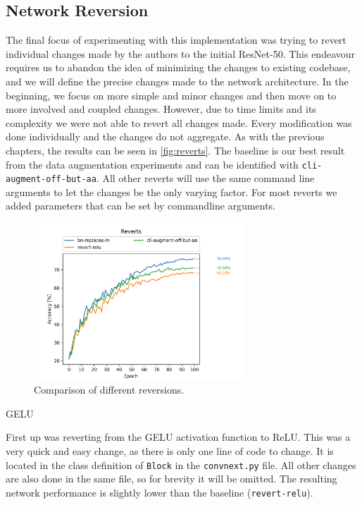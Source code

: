 \documentclass{article}
\begin{document}
\subsection{Network Reversion}\label{subsec:network-reversion}
The final focus of experimenting with this implementation was trying to revert individual changes made by the authors to the initial ResNet-50.
This endeavour requires us to abandon the idea of minimizing the changes to existing codebase, and we will define the precise changes made to the network architecture.
In the beginning, we focus on more simple and minor changes and then move on to more involved and coupled changes.
However, due to time limits and its complexity we were not able to revert all changes made.
Every modification was done individually and the changes do not aggregate.
As with the previous chapters, the results can be seen in \autoref{fig:reverts}.
The baseline is our best result from the data augmentation experiments and can be identified with \texttt{cli-augment-off-but-aa}.
All other reverts will use the same command line arguments to let the changes be the only varying factor.
For most reverts we added parameters that can be set by commandline arguments.

\begin{figure}[h]
    \centering
    \includegraphics[width=0.7\textwidth]{images/reverts}
    \caption{Comparison of different reversions.}
    \label{fig:reverts}
\end{figure}

GELU

First up was reverting from the GELU activation function to ReLU\@.
This was a very quick and easy change, as there is only one line of code to change.
It is located in the class definition of \texttt{Block} in the \texttt{convnext.py} file.
All other changes are also done in the same file, so for brevity it will be omitted.
The resulting network performance is slightly lower than the baseline (\texttt{revert-relu}).
\end{document}
